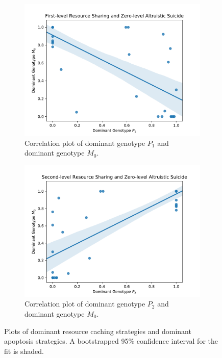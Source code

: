 \begin{figure}[t]
\begin{center}

\begin{subfigure}[b]{\columnwidth}
  \includegraphics[width=\columnwidth]{img/champion_res_pool1_vs_champion_damage_suicide0}
  \caption{
  Correlation plot of dominant genotype $P_1$ and dominant genotype $M_0$.
  }
  \label{fig:champion_res_pool1_vs_champion_damage_suicide0}
\end{subfigure}

\begin{subfigure}[b]{\columnwidth}
  \includegraphics[width=\columnwidth]{img/champion_res_pool2_vs_champion_damage_suicide0}
  \caption{
  Correlation plot of dominant genotype $P_2$ and dominant genotype $M_0$.
  }
  \label{fig:champion_res_pool2_vs_champion_damage_suicide0}
\end{subfigure}

\caption{
Plots of dominant resource caching strategies and dominant apoptosis strategies.
A bootstrapped 95\% confidence interval for the fit is shaded.
}
\label{fig:damage_suicide}
\end{center}
\end{figure}
